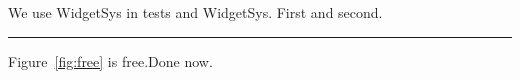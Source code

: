 \documentclass{article}
\newcommand{\sys}{WidgetSys\xspace}
\begin{document}
We use \sys in tests and \sys.
First\footnotemark{} and second\footnotemark.
\addtocounter{footnote}{-1}
\begin{center}
\rule{2cm}{1cm}
\label{fig:free}
\end{center}
Figure~\ref{fig:free} is free.\space Done now.
\end{document}
